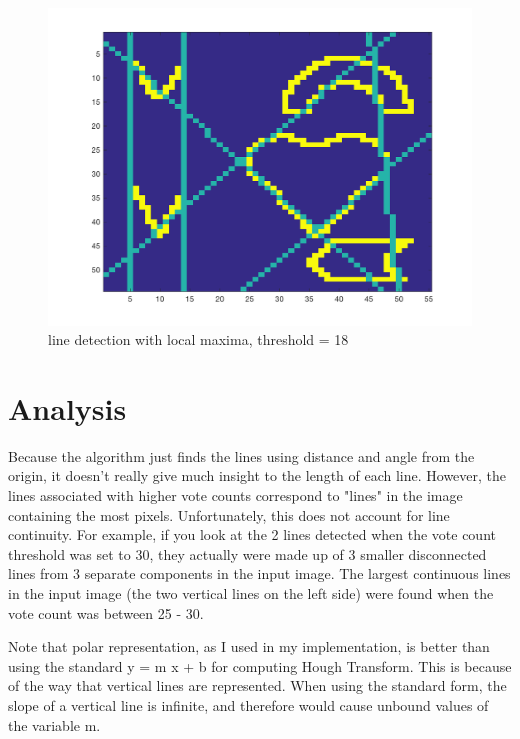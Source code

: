 \documentclass[paper=a4, fontsize=11pt]{scrartcl} %
\numberwithin{equation}{section} %
\numberwithin{figure}{section} %
\numberwithin{table}{section} %
\begin{document}
\begin{figure}[H]
  \centering
  \begin{minipage}[b]{0.75\textwidth}
    \includegraphics[width=\textwidth]{local_maxima_selection.png}
    \caption{line detection with local maxima, threshold = 18}
  \end{minipage}
\end{figure}

\section{Analysis}

Because the algorithm just finds the lines using distance and angle from the origin, it doesn't really give much insight to the length of each line. However, the lines associated with higher vote counts correspond to "lines" in the image containing the most pixels. Unfortunately, this does not account for line continuity. For example, if you look at the 2 lines detected when the vote count threshold was set to 30, they actually were made up of 3 smaller disconnected lines from 3 separate components in the input image. The largest continuous lines in the input image (the two vertical lines on the left side) were found when the vote count was between 25 - 30.

Note that polar representation, as I used in my implementation, is better than using the standard y = m x + b for computing Hough Transform. This is because of the way that vertical lines are represented. When using the standard form, the slope of a vertical line is infinite, and therefore would cause unbound values of the variable m.
\end{document}
